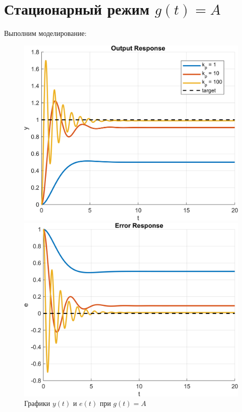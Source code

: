 \section{Стационарный режим $g(t) = A$}
Выполним моделирование:
\begin{figure}[H]
    \centering
    \begin{minipage}{0.45\textwidth}
        \centering
        \includegraphics[width=1\textwidth, trim={1cm 0cm 1cm 0cm}]{../images/3_1.png}
    \end{minipage}
    \hfill
    \begin{minipage}{0.45\textwidth}
        \centering
        \includegraphics[width=1\textwidth, trim={1cm 0cm 1cm 0cm}]{../images/3_2.png}
    \end{minipage}
    \caption{Графики $y(t)$ и $e(t)$ при $g(t) = A$}
\end{figure}

